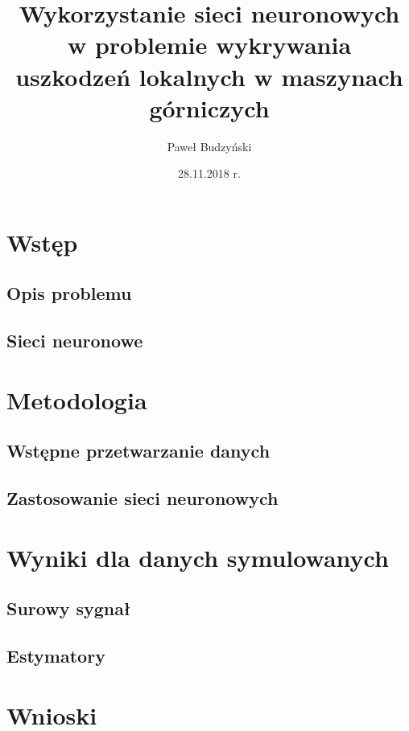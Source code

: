 \documentclass[12pt, a4paper, oneside, draft]{report}
\author{Paweł Budzyński}
\title{Wykorzystanie sieci neuronowych w problemie wykrywania uszkodzeń lokalnych w maszynach górniczych}
\date{28.11.2018 r.}
\newcommand{\mychapter}[2]{
	\setcounter{chapter}{#1}
	\setcounter{section}{0}
	\chapter*{#2}
	\addcontentsline{toc}{chapter}{#2}
}
\begin{document}
	\maketitle
	\tableofcontents
	\chapter{Wstęp}
	
	
	\section{Opis problemu}
	\section{Sieci neuronowe}
	
	
	\chapter{Metodologia}
	
	\section{Wstępne przetwarzanie danych}
	
	\section{Zastosowanie sieci neuronowych}
	
	
	
	\chapter{Wyniki dla danych symulowanych}
	
	\section{Surowy sygnał}
	
	\section{Estymatory}
	
	\chapter{Wnioski}
	
	
	
	\begin{center}
	\end{center}
	
	
	
\end{document}
